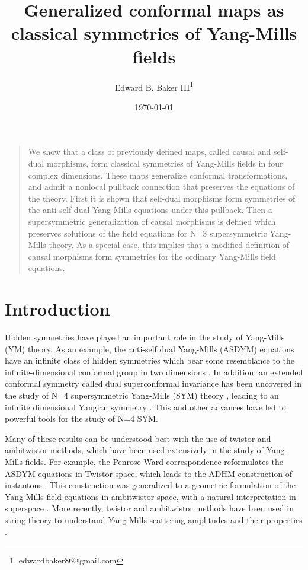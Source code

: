 \documentclass[12pt]{article}
\title{Generalized conformal maps as classical symmetries of Yang-Mills fields}
\author{Edward B. Baker III\thanks{edwardbaker86@gmail.com}}
\date{\today}
\newenvironment{sciabstract}{%
\begin{quote} \bf}
{\end{quote}}
\begin{document}
 

\maketitle 

\begin{sciabstract}


We show that a class of previously defined maps, called causal and self-dual morphisms, form classical symmetries of Yang-Mills fields in four complex dimensions.  These maps generalize conformal transformations, and admit a nonlocal pullback connection that preserves the equations of the theory.  First it is shown that self-dual morphisms form symmetries of the anti-self-dual Yang-Mills equations under this pullback.  Then a supersymmetric generalization of causal morphisms is defined which preserves solutions of the field equations for N=3 supersymmetric Yang-Mills theory.  As a special case, this implies that a modified definition of causal morphisms form symmetries for the ordinary Yang-Mills field equations.
\end{sciabstract}


\section{Introduction}


Hidden symmetries have played an important role in the study of Yang-Mills (YM) theory. As an example, the anti-self dual Yang-Mills (ASDYM) equations have an infinite class of hidden symmetries which bear some resemblance to the infinite-dimensional conformal group in two dimensions \cite{DOLAN1982387}\cite{CHAU1983391}\cite{POPOV_1999}.  In addition, an extended conformal symmetry called dual superconformal invariance has been uncovered in the study of N=4 supersymmetric Yang-Mills (SYM) theory \cite{Mason_2009}\cite{Arkani_Hamed_2010}, leading to an infinite dimensional Yangian symmetry \cite{Drummond_2009}.  
 This and other advances have led to powerful tools for the study of N=4 SYM. 

Many of these results can be understood best with the use of twistor and ambitwistor methods, which have been used extensively in the study of Yang-Mills fields.  For example, the Penrose-Ward correspondence reformulates the ASDYM equations in Twistor space, which leads to the ADHM construction of instantons \cite{1977PhLA...61...81W}\cite{ATIYAH1978185}\cite{atiyah1979geometry}.  This construction was generalized to a geometric formulation of the Yang-Mills field equations in ambitwistor space, with a natural interpretation in superspace \cite{WITTEN1978394}\cite{ISENBERG1978462}\cite{Harnad1985Constraint}\cite{harnad1989supersymmetric}.  More recently, twistor and ambitwistor methods have been used in string theory to understand Yang-Mills scattering amplitudes and their properties \cite{Witten_2004}\cite{atiyah2017twistor}.
\end{document}
